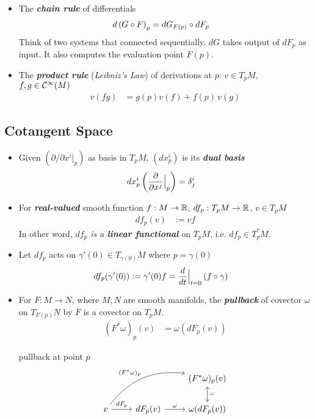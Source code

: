 \documentclass[11pt]{article}
\begin{document}
\begin{itemize}
\item The \emph{\textbf{chain rule}} of differentials
\begin{align*}
d\left(G \circ F\right)_{p} &= dG_{F(p)} \circ dF_{p}
\end{align*} Think of two systems that connected sequentially. $dG$ takes output of $dF_p$ as input. It also computes the evaluation point $F(p)$.

\item The \emph{\textbf{product rule}} (\emph{Leibniz's Law}) of derivations at $p$: $v \in T_pM$, $f, g \in {\mathcal C}^{\infty}(M)$
\begin{align*}
v(fg) &= g(p) v(f) + f(p)\, v(g)
\end{align*}
\end{itemize}
\subsection{Cotangent Space}
\begin{itemize}
\item Given $(\partial / \partial x^i|_{p})$ as basis in $T_pM$, $(dx_{p}^i)$ is its \emph{\textbf{dual basis}}
\begin{align}
dx_{p}^{i}\left(\frac{\partial }{ \partial x^{j}}\Bigr|_{p}\right) &= \delta_{j}^{i} \label{eqn: dual_basis_def}
\end{align}

\item For \emph{\textbf{real-valued}} smooth function $f: M \rightarrow {\mathbb R}$, $df_p: T_pM \rightarrow {\mathbb R}$, $v\in T_pM$
\begin{align}
df_{p}(v) &:= vf   \label{eqn: differential_1_form_at_p_tang_vec}
\end{align} In other word, \emph{$df_p$ is a \textbf{linear functional}} on $T_pM$, i.e. $df_p \in T_p^{*}M$.

\item Let $df_p$ acts on $\gamma'(0) \in T_{\gamma(0)}M$ where $p = \gamma(0)$
\begin{align*}
df_{p}(\gamma'(0)) &:= \gamma'(0)f = \frac{d}{dt}\Bigr|_{t=0}\left(f \circ \gamma\right)
\end{align*}

\item For $F: M \rightarrow N$, where $M, N$ are smooth manifolds, the \emph{\textbf{pullback}} of covector $\omega$ on $T_{F(p)}N$ by $F$ is a covector on $T_{p}M$. 
\begin{align}
(F^{*}\omega)_{p}(v) &= \omega(dF_p(v)) \label{eqn: pullback_covector_def}
\end{align}
\begin{remark}
pullback at point $p$
\[
  \begin{tikzcd}
                     &  &(F^{*}\omega)_{p}(v) \arrow[d, leftrightarrow, "="] \\
     v  \arrow{r}{dF_p} \arrow[rru, bend left, "(F^{*}\omega)_{p}"] & dF_p(v)  \arrow{r}{\omega} &  \omega(dF_p(v))
  \end{tikzcd}
\] 
\end{remark}
\end{itemize}
\end{document}
